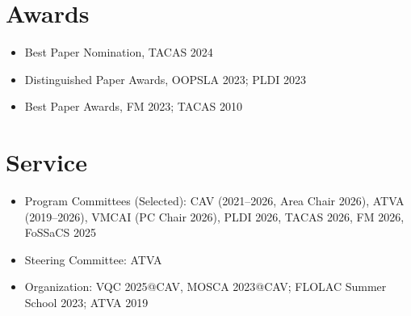\documentclass[a4paper,11pt]{article}
\begin{document}
\section*{Awards}
\begin{itemize}
  \item Best Paper Nomination, TACAS 2024
  \item Distinguished Paper Awards, OOPSLA 2023; PLDI 2023
  \item Best Paper Awards, FM 2023; TACAS 2010
\end{itemize}

\section*{Service}
\begin{itemize}
  \item Program Committees (Selected): CAV (2021–2026, Area Chair 2026), ATVA (2019–2026), VMCAI (PC Chair 2026), PLDI 2026, TACAS 2026, FM 2026, FoSSaCS 2025
  \item Steering Committee: ATVA
  \item Organization: VQC 2025@CAV, MOSCA 2023@CAV; FLOLAC Summer School 2023; ATVA 2019
\end{itemize}
\end{document}
